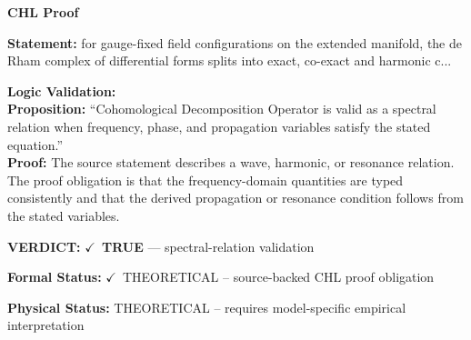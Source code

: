 \vspace{0.45em}
\noindent\textbf{CHL Proof}\par
\textbf{Statement:} for gauge-fixed field configurations on the extended manifold, the de Rham complex of
differential forms splits into exact, co-exact and harmonic c...

\textbf{Logic Validation:}\\
\textbf{Proposition:} ``Cohomological Decomposition Operator is valid as a spectral relation when frequency,
phase, and propagation variables satisfy the stated equation.''\\
\textbf{Proof:} The source statement describes a wave, harmonic, or resonance relation. The proof
obligation is that the frequency-domain quantities are typed consistently and that the
derived propagation or resonance condition follows from the stated variables.

\textbf{VERDICT:} \ensuremath{\checkmark}\ \textbf{TRUE} --- spectral-relation validation

\textbf{Formal Status:} \ensuremath{\checkmark}\ THEORETICAL -- source-backed CHL proof obligation

\textbf{Physical Status:} THEORETICAL -- requires model-specific empirical interpretation
\par\vspace{0.45em}
\par
\ifTZPDarkEdition
{}
\fi
\endgroup
\endgroup
